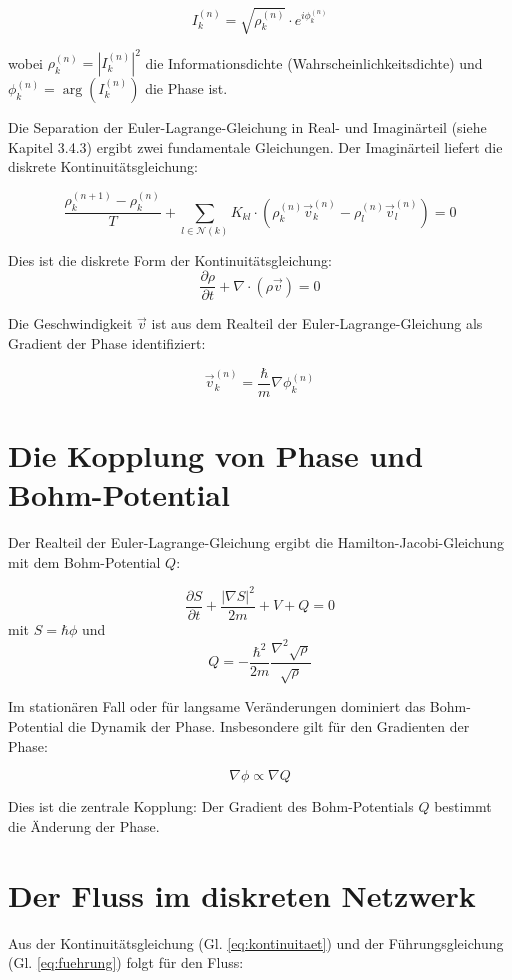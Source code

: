 \[
I_k^{(n)} = \sqrt{\rho_k^{(n)}} \cdot e^{i \phi_k^{(n)}}
\]

wobei \( \rho_k^{(n)} = |I_k^{(n)}|^2 \) die Informationsdichte (Wahrscheinlichkeitsdichte) 
und \( \phi_k^{(n)} = \arg(I_k^{(n)}) \) die Phase ist.

Die Separation der Euler-Lagrange-Gleichung in Real- und Imaginärteil (siehe Kapitel 3.4.3) 
ergibt zwei fundamentale Gleichungen. Der Imaginärteil liefert die diskrete Kontinuitätsgleichung:

\[
\frac{\rho_k^{(n+1)} - \rho_k^{(n)}}{T} 
+ \sum_{l \in \mathcal{N}(k)} K_{kl} \cdot \left( \rho_k^{(n)} \vec{v}_k^{(n)} - \rho_l^{(n)} \vec{v}_l^{(n)} \right) = 0
\]
\label{eq:kontinuitaet}

Dies ist die diskrete Form der Kontinuitätsgleichung:
\[
\frac{\partial \rho}{\partial t} + \nabla \cdot (\rho \vec{v}) = 0
\]

Die Geschwindigkeit \( \vec{v} \) ist aus dem Realteil der Euler-Lagrange-Gleichung als Gradient 
der Phase identifiziert:

\[
\vec{v}_k^{(n)} = \frac{\hbar}{m} \nabla \phi_k^{(n)}
\]
\label{eq:fuehrung}

\section{Die Kopplung von Phase und Bohm-Potential}

Der Realteil der Euler-Lagrange-Gleichung ergibt die Hamilton-Jacobi-Gleichung 
mit dem Bohm-Potential \( Q \):

\[
\frac{\partial S}{\partial t} + \frac{|\nabla S|^2}{2m} + V + Q = 0
\]
mit \( S = \hbar \phi \) und 
\[
Q = -\frac{\hbar^2}{2m} \frac{\nabla^2 \sqrt{\rho}}{\sqrt{\rho}}
\]

Im stationären Fall oder für langsame Veränderungen dominiert das Bohm-Potential 
die Dynamik der Phase. Insbesondere gilt für den Gradienten der Phase:

\[
\nabla \phi \propto \nabla Q
\]
\label{eq:phi_q_gradient}

Dies ist die zentrale Kopplung: Der Gradient des Bohm-Potentials \( Q \) bestimmt die Änderung der Phase.

\section{Der Fluss im diskreten Netzwerk}

Aus der Kontinuitätsgleichung (Gl. \ref{eq:kontinuitaet}) und der Führungsgleichung 
(Gl. \ref{eq:fuehrung}) folgt für den Fluss:

